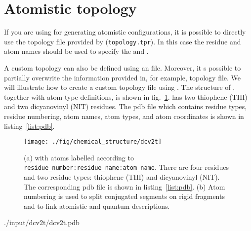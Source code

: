 \section{Atomistic topology}
\label{sec:atomistic}

If you are using \gromacs for generating atomistic configurations, it is possible to directly use the topology file provided by \gromacs (\texttt{topology.tpr}). In this case the \gromacs residue and atom names should be used to specify the  and . 

A custom topology can also be defined using an \xml file. Moreover, it s possible to partially overwrite the information provided in, for example, \gromacs topology file. We will illustrate how to create a custom topology file using \dcvt. The structure of \dcvt, together with atom type definitions, is shown in fig.~\ref{fig:dcv2t}. \dcvt has two thiophene (THI) and two dicyanovinyl (NIT) residues. The pdb file which contains residue types, residue numbering, atom names, atom types, and atom coordinates is shown in listing~\ref{list:pdb}.

\begin{figure}[ht]
\centering
\texttt{[image: ./fig/chemical\_structure/dcv2t]}
\caption{\small (a) \dcvt with atoms labelled according to \texttt{residue\_number:residue\_name:atom\_name}. There are four residues and two residue types: thiophene (THI) and dicyanovinyl (NIT). The corresponding pdb file is shown in listing~\ref{list:pdb}. (b) Atom numbering is used to split conjugated segments on rigid fragments and to link atomistic and quantum descriptions.}
\label{fig:dcv2t}
\end{figure}

%
{./input/dcv2t/dcv2t.pdb}
\vfill